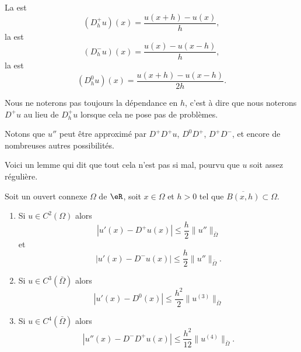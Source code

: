 \begin{definition}
    La  est 
    \begin{equation}
        (D^+_hu)(x)=\frac{ u(x+h)-u(x) }{ h },
    \end{equation}
    la  est 
    \begin{equation}
        (D^-_hu)(x)=\frac{ u(x)-u(x-h) }{ h },
    \end{equation}
    la  est 
    \begin{equation}
        (D^0_hu)(x)=\frac{ u(x+h)-u(x-h) }{ 2h }.
    \end{equation}
\end{definition}
Nous ne noterons pas toujours la dépendance en \( h\), c'est à dire que nous noterons \( D^+u\) au lieu de \( D^+_hu\) lorsque cela ne pose pas de problèmes.

Notons que \( u''\) peut être approximé par \( D^+D^+u\), \( D^0D^+\), \( D^+D^-\), et encore de nombreuses autres possibilités.

Voici un lemme qui dit que tout cela n'est pas si mal, pourvu que \( u\) soit assez régulière.

\begin{lemma}       \label{LEMooZECZooVKxOZZ}
    Soit un ouvert connexe \( \Omega\) de \( \eR\), soit \( x\in \Omega\) et \( h>0\) tel que \( \overline{ B(x,h) }\subset \Omega\).
    \begin{enumerate}
        \item
            Si \( u\in C^2(\Omega)\) alors
            \begin{equation}
                | u'(x)-D^+u(x) |\leq \frac{ h }{2}\| u'' \|_{\bar\Omega}
            \end{equation}
            et
            \begin{equation}
                | u'(x)-D^-u(x) |\leq \frac{ h }{2}\| u'' \|_{\bar\Omega}.
            \end{equation}
        \item       \label{ITEMooSAWJooJUTWAb}
            Si \( u\in C^3(\bar\Omega)\) alors
            \begin{equation}
                | u'(x)-D^0(x) |\leq \frac{ h^2 }{2}\| u^{(3)} \|_{\bar\Omega}
            \end{equation}
        \item       \label{ITEMooRWUHooZJLKuL}
            Si \( u\in C^4(\bar \Omega)\) alors
            \begin{equation}
                | u''(x)-D^-D^+u(x) |\leq \frac{ h^2 }{ 12 }\| u^{(4)} \|_{\bar\Omega}.
            \end{equation}
    \end{enumerate}
\end{lemma}

